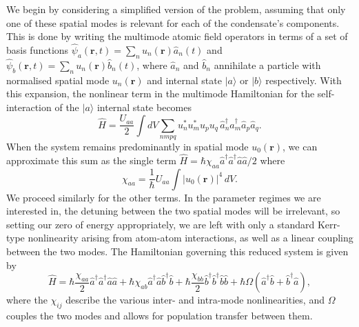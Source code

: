 \documentclass{iopart}
\begin{document}
 
We begin by considering a simplified version of the problem, assuming that only one of these spatial modes is relevant for each of the condensate's components.  This is done by writing the multimode atomic field operators in terms of a set of basis functions $\hat{\psi}_a({\mathbf{r}},t) = \sum_n u_{n}({\mathbf{r}}) \hat{a}_{n}(t)$ and $\hat{\psi}_b({\mathbf{r}},t) = \sum_n u_{n}({\mathbf{r}}) \hat{b}_{n}(t)$, where $\hat{a}_{n}$ and $\hat{b}_{n}$ annihilate a particle with normalised spatial mode $u_n({\mathbf{r}})$ and internal state $|a\rangle$ or $|b\rangle$ respectively. With this expansion, the nonlinear term in the multimode Hamiltonian for the self-interaction of the $|a\rangle$ internal state becomes
\begin{equation}
\hat{H} = \frac{U_{aa}}{2} \int dV \sum_{nmpq} u_n^* u_m^* u_p u_q \, \hat{a}^{\dagger}_{n} \hat{a}^{\dagger}_{m} \hat{a}_{p} \hat{a}_{q} .
\end{equation}
When the system remains predominantly in spatial mode $u_0(\mathbf{r})$, we can approximate this sum as the single term $\hat{H} = \hbar\chi_{aa} \hat{a}^{\dagger} \hat{a}^{\dagger} \hat{a} \hat{a}/2$ where
\begin{equation}
\chi_{aa} = \frac{1}{\hbar} U_{aa} \int |u_{0}({\mathbf{r}})|^4 \, dV.
\label{eqChiUequivalence}
\end{equation}
We proceed similarly for the other terms.  In the parameter regimes we are interested in, the detuning between the two spatial modes will be irrelevant, so setting our zero of energy appropriately, we are left with only a standard Kerr-type nonlinearity arising from atom-atom interactions, as well as a linear coupling between the two modes.  The Hamiltonian governing this reduced system is given by
\begin{equation}
\hat{H} = \hbar\frac{\chi_{aa}}{2} \hat{a}^{\dagger} \hat{a}^{\dagger} \hat{a} \hat{a}
          + \hbar\chi_{ab} \hat{a}^{\dagger} \hat{a} \hat{b}^{\dagger} \hat{b}
          + \hbar\frac{\chi_{bb}}{2} \hat{b}^{\dagger} \hat{b}^{\dagger} \hat{b} \hat{b}
          + \hbar\Omega (\hat{a}^{\dagger} \hat{b} + \hat{b}^{\dagger}  \hat{a} ),
\label{eqTwoModeHamiltonian}
\end{equation}
where the $\chi_{ij}$ describe the various inter- and intra-mode nonlinearities, and $\Omega$ couples the two modes and allows for population transfer between them.
\end{document}
